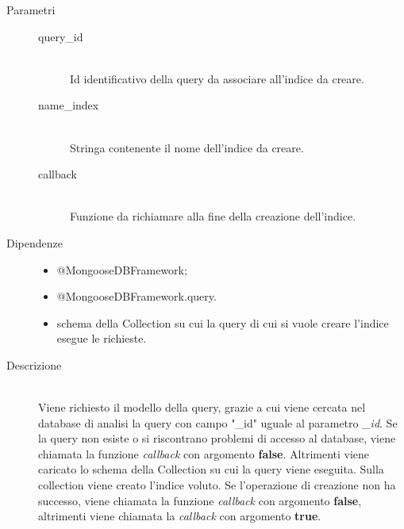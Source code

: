 \begin{description}
\begin{mldescription}
    \begin{description}
	 \item[Parametri] \hfill
	  \begin{description}
	   \item[query\_id] \hfill \\
	   Id identificativo della query da associare all'indice da creare.
	   \item[name\_index] \hfill \\
	   Stringa contenente il nome dell'indice da creare.
	   \item[callback] \hfill \\
	   Funzione da richiamare alla fine della creazione dell'indice.
	  \end{description}
	 \item[Dipendenze] \hfill
	  \begin{itemize}
	   \item @MongooseDBFramework;	   
	   \item @MongooseDBFramework.query.
	   \item schema della Collection su cui la query di cui si vuole creare l'indice esegue le richieste.
	  \end{itemize}
	 \item[Descrizione] \hfill \\
	 Viene richiesto il modello della query, grazie a cui viene cercata nel database di analisi la query con campo "\_id" uguale al parametro \textit{\_id}. Se la query non esiste o si riscontrano problemi di accesso al database, viene chiamata la funzione \textit{callback} con argomento \textbf{false}. Altrimenti viene caricato lo schema della Collection su cui la query viene eseguita. Sulla collection viene creato l'indice voluto. Se l'operazione di creazione non ha successo, viene chiamata la funzione \textit{callback} con argomento \textbf{false}, altrimenti viene chiamata la \textit{callback} con argomento \textbf{true}.
	\end{description}	    
   

\end{mldescription}
\end{description}
